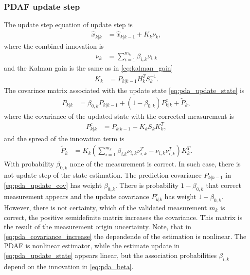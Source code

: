 \subsubsection{PDAF update step}
The update step equation of update step is
\begin{align}
    \hat{x}_{k|k} &= \hat{x}_{k|k-1} + K_k \nu_k, \label{eq:pda_update_state}
\end{align}
where the combined innovation is
\begin{align}
    \nu_k &= \sum_{i=1}^{m_k} \beta_{i,k} \nu_{i,k}
\end{align}
and the Kalman gain is the same as in \eqref{eq:kalman_gain}
\begin{align}
    K_k &= P_{k|k-1} H_k^T S_k^{-1}.
\end{align}
The covarince matrix associated with the update state \eqref{eq:pda_update_state} is
\begin{align}
    P_{k|k} &= \beta_{0,k} P_{k|k-1} + (1-\beta_{0,k}) P_{k|k}^c + \tilde{P}_k,
\end{align}
where the covariance of the updated state with the corrected measurement is
\begin{align}
    P_{k|k}^c &= P_{k|k-1} - K_k S_k K_{k}^T, \label{eq:pda_update_cov}
\end{align}
and the spread of the innovation term is
\begin{align}
    \tilde{P}_k &= K_k (\sum_{i=1}^{m_k} \beta_{i.k} \nu_{i,k} \nu_{i,k}^T - \nu_{i,k} \nu_{i,k}^T) K_k^T. \label{eq:pda_covariance_increase}
\end{align}
With probability $\beta_{0,k}$ none of the measurement is correct. In such case, there is not update step of the
state estimation. The prediction covariance $P_{k|k-1}$ in \eqref{eq:pda_update_cov} has weight $\beta_{0,k}$. There is probability $1-\beta_{0,k}$ that correct measurement appears and the update covariance $P_{k|k}^c$ has weight $1-\beta_{0,k}$. However, there is not certainty, which of the validated measurement $m_k$ is correct, the positive semidefinite matrix increases the covariance. This matrix is the result of the measurement origin uncertainty. Note, that in \eqref{eq:pda_covariance_increase} the dependende of the estimation is nonlinear. The PDAF is nonlinear estimator, while the estimate update in \eqref{eq:pda_update_state} appears linear, but the association probabilities $\beta_{i,k}$ depend on the innovation in \eqref{eq:pda_beta}.



